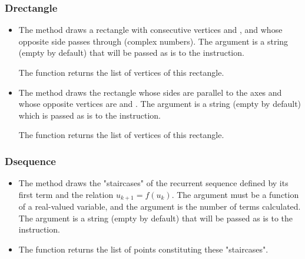 \subsubsection{Drectangle}
\begin{itemize}
    \item The  method draws a rectangle with consecutive vertices  and , and whose opposite side passes through  (complex numbers). The  argument is a string (empty by default) that will be passed as is to the \drawcmd instruction. \par
    The  function returns the list of vertices of this rectangle.
    
    \item The method  draws the rectangle whose sides are parallel to the axes and whose opposite vertices are  and . ​​The argument  is a string (empty by default) which is passed as is to the \drawcmd instruction. \par
    The function  returns the list of vertices of this rectangle.
\end{itemize}

\subsubsection{Dsequence}
\begin{itemize}
    \item The  method draws the "staircases" of the recurrent sequence defined by its first term  and the relation \(u_{k+1}=f(u_k)\). The argument  must be a function of a real-valued variable, and the argument  is the number of terms calculated. The argument  is a string (empty by default) that will be passed as is to the \drawcmd instruction.
    \item The  function returns the list of points constituting these "staircases".
\end{itemize}

